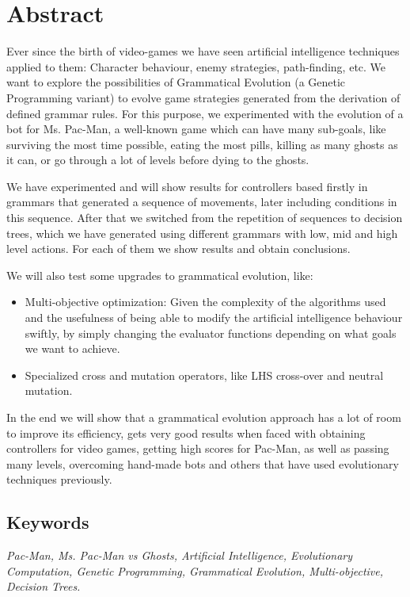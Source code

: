 \chapter{Abstract} \label{cap:abstract}
Ever since the birth of video-games we have seen artificial intelligence techniques applied to them: Character behaviour, enemy strategies, path-finding, etc. We want to explore the possibilities of Grammatical Evolution (a Genetic Programming variant) to evolve game strategies generated from the derivation of defined grammar rules. For this purpose, we experimented with the evolution of a bot for Ms. Pac-Man, a well-known game which can have many sub-goals, like surviving the most time possible, eating the most pills, killing as many ghosts as it can, or go through a lot of levels before dying to the ghosts.
 
We have experimented and will show results for controllers based firstly in grammars that generated a sequence of movements, later including conditions in this sequence.
After that we switched from the repetition of sequences to decision trees, which we have generated using different grammars with low, mid and high level actions. For each of them we show results and obtain conclusions.
 
We will also test some upgrades to grammatical evolution, like:
\begin{itemize}
\item Multi-objective optimization: Given the complexity of the algorithms used and the usefulness of being able to modify the artificial intelligence behaviour swiftly, by simply changing the evaluator functions depending on what goals we want to achieve.
\item Specialized cross and mutation operators, like LHS cross-over and neutral mutation.
\end{itemize}
 
In the end we will show that a grammatical evolution approach has a lot of room to improve its efficiency, gets very good results when faced with obtaining controllers for video games, getting high scores for Pac-Man, as well as passing many levels, overcoming hand-made bots and others that have used evolutionary techniques previously.

\section*{Keywords}
\textit{Pac-Man, Ms. Pac-Man vs Ghosts, Artificial Intelligence, Evolutionary Computation, Genetic Programming, Grammatical Evolution, Multi-objective, Decision Trees.}
